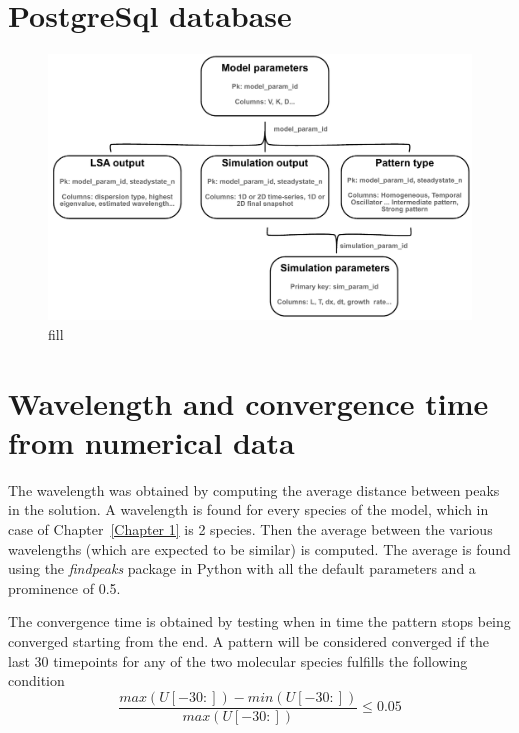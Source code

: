 \section{PostgreSql database}\label{PostgreSql database}
\begin{figure}[H]

    \includegraphics[width=1\textwidth]{chapters/Methods/psql_schema}
    \caption{fill}
    \label{psql_schema}
\end{figure}

\section{Wavelength and convergence time from numerical data}\label{Wavelength and convergence time from numerical data}
The wavelength was obtained by computing the average distance between peaks in the solution.
A wavelength is found for every species of the model, which in case of Chapter~\ref{Chapter 1} is 2 species.
Then the average between the various wavelengths (which are expected to be similar) is computed.
The average is found using the \textit{findpeaks} package in Python with all the default parameters and a prominence of 0.5.

The convergence time is obtained by testing when in time the pattern stops being converged starting from the end.
A pattern will be considered converged if the last 30 timepoints for any of the two molecular species fulfills the following condition
\begin{equation}
    \frac{max(U[-30:]) - min(U[-30:])}{max(U[-30:])} \leq 0.05
\end{equation}

